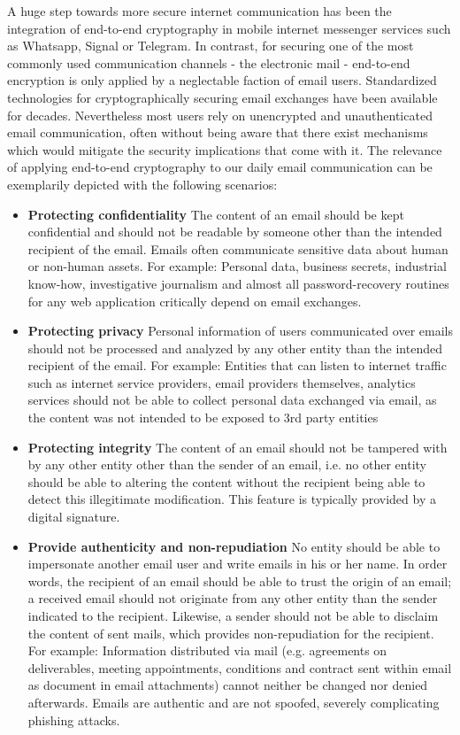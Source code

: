 A huge step towards more secure internet communication has been the integration of end-to-end cryptography in mobile internet messenger services such as Whatsapp, Signal or Telegram. In contrast, for securing one of the most commonly used communication channels - the electronic mail - end-to-end encryption is only applied by a neglectable faction \cite{secureEmail} of email users. Standardized technologies for cryptographically securing email exchanges have been available for decades. Nevertheless most users rely on unencrypted and unauthenticated email communication, often without being aware that there exist mechanisms which would mitigate the security implications that come with it. The relevance of applying end-to-end cryptography to our daily email communication can be exemplarily depicted with the following scenarios:
\begin{itemize}
	\item \textbf{Protecting confidentiality} \newline
	The content of an email should be kept confidential and should not be readable by someone other than the intended recipient of the email. Emails often communicate sensitive data about human or non-human assets.
	For example: Personal data, business secrets, industrial know-how, investigative journalism and almost all password-recovery routines for any web application critically depend on email exchanges.
	\item \textbf{Protecting privacy} \newline
	Personal information of users communicated over emails should not be processed and analyzed by any other entity than the intended recipient of the email.
	For example: Entities that can listen to internet traffic such as internet service providers, email providers themselves, analytics services should not be able to collect personal data exchanged via email, as the content was not intended to be exposed to 3rd party entities
	\item \textbf{Protecting integrity} \newline
	The content of an email should not be tampered with by any other entity other than the sender of an email, i.e. no other entity should be able to altering the content without the recipient being able to detect this illegitimate modification. This feature is typically provided by a digital signature.
	\item \textbf{Provide authenticity and non-repudiation} \newline
	No entity should be able to impersonate another email user and write emails in his or her name. In order words, the recipient of an email should be able to trust the origin of an email; a received email should not originate from any other entity than the sender indicated to the recipient. Likewise, a sender should not be able to disclaim the content of sent mails, which provides non-repudiation for the recipient.
	For example: Information distributed via mail (e.g. agreements on deliverables, meeting appointments, conditions and contract sent within email as document in email attachments) cannot neither be changed nor denied afterwards.
	Emails are authentic and are not spoofed, severely complicating phishing attacks.
\end{itemize}
